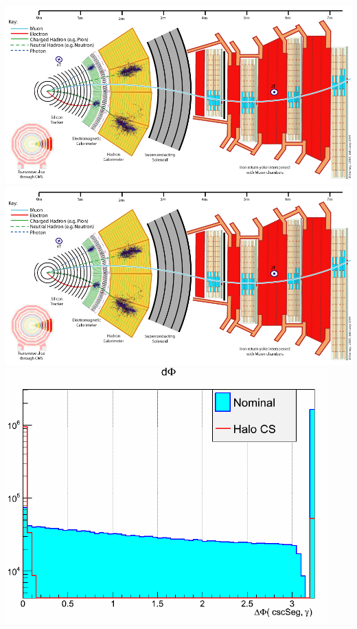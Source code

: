 \begin{center}
\centering
\includegraphics[scale=0.2]{THESISPLOTS/CMS_Slice.png}
\includegraphics[scale=0.2]{THESISPLOTS/CMS_Slice.png}
\includegraphics[scale=0.5]{THESISPLOTS/CSC_Segment_Halo_data.png}

\end{center}

